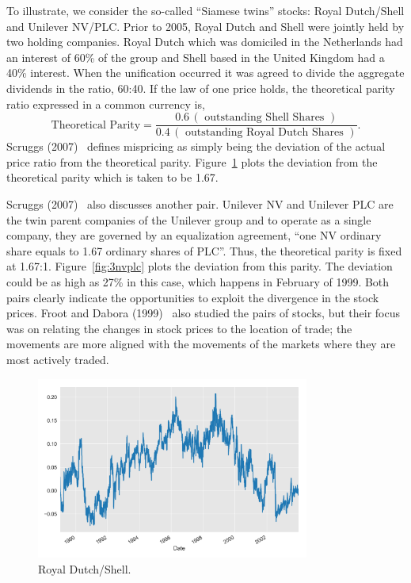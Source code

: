 To illustrate, we consider the so-called ``Siamese twins'' stocks: Royal Dutch/Shell and Unilever NV/PLC. Prior to 2005, Royal Dutch and Shell were jointly held by two holding companies. Royal Dutch which was domiciled in the Netherlands had an interest of 60\% of the group and Shell based in the United Kingdom had a 40\% interest. When the unification occurred it was agreed to divide the aggregate dividends in the ratio, 60:40. If the law of one price holds, the theoretical parity ratio expressed in a common currency is,
	\[
	\text{Theoretical Parity}= \frac{0.6 \,(\text{ outstanding Shell Shares })}{0.4 \,(\text{ outstanding Royal Dutch Shares })}.
	\]
Scruggs (2007)~\cite{scruggs} defines mispricing as simply being the deviation of the actual price ratio from the theoretical parity. Figure~\ref{fig:3royal} plots the deviation from the theoretical parity which is taken to be 1.67. 


Scruggs (2007)~\cite{scruggs} also discusses another pair. Unilever NV and Unilever PLC are the twin parent companies of the Unilever group and to operate as a single company, they are governed by an equalization agreement, ``one NV ordinary share equals to 1.67 ordinary shares of PLC''. Thus, the theoretical parity is fixed at 1.67:1. Figure~\ref{fig:3nvplc} plots the deviation from this parity. The deviation could be as high as 27\% in this case, which happens in February of 1999. Both pairs clearly indicate the opportunities to exploit the divergence in the stock prices. Froot and Dabora (1999)~\cite{froot1999stock} also studied the pairs of stocks, but their focus was on relating the changes in stock prices to the location of trade; the movements are more aligned with the movements of the markets where they are most actively traded.

	\begin{figure}[!ht]
	\centering
	\includegraphics[width=0.8\textwidth]{chapters/chapter_stat_ts/figures/rd_shell.png}
	\caption{Royal Dutch/Shell. \label{fig:3royal}}
	\end{figure}
	
